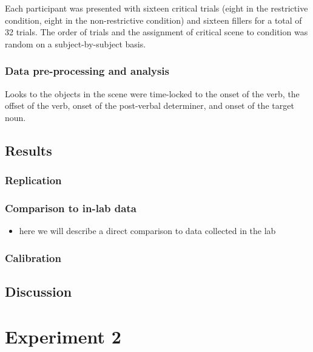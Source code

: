 \documentclass[
  man,floatsintext]{apa6}
\providecommand{\tightlist}{%
  \setlength{\itemsep}{0pt}\setlength{\parskip}{0pt}}
\begin{document}
Each participant was presented with sixteen critical trials (eight in
the restrictive condition, eight in the non-restrictive condition) and
sixteen fillers for a total of 32 trials. The order of trials and the
assignment of critical scene to condition was random on a
subject-by-subject basis.

\hypertarget{data-pre-processing-and-analysis}{%
\subsubsection{Data pre-processing and analysis}\label{data-pre-processing-and-analysis}}

Looks to the objects in the scene were time-locked to the onset of the
verb, the offset of the verb, onset of the post-verbal determiner, and
onset of the target noun.

\hypertarget{results}{%
\subsection{Results}\label{results}}

\hypertarget{replication}{%
\subsubsection{Replication}\label{replication}}

\hypertarget{comparison-to-in-lab-data}{%
\subsubsection{Comparison to in-lab data}\label{comparison-to-in-lab-data}}

\begin{itemize}
\tightlist
\item
  here we will describe a direct comparison to data collected in the
  lab
\end{itemize}

\hypertarget{calibration}{%
\subsubsection{Calibration}\label{calibration}}

\hypertarget{discussion}{%
\subsection{Discussion}\label{discussion}}

\hypertarget{experiment-2}{%
\section{Experiment 2}\label{experiment-2}}
\end{document}
